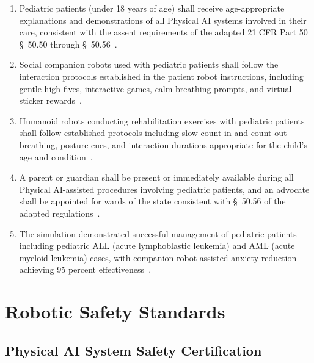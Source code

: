 \documentclass[11pt,letterpaper]{article}
\begin{document}
\begin{enumerate}[label=(\alph*)]
\item Pediatric patients (under 18 years of age) shall receive age-appropriate
  explanations and demonstrations of all Physical AI systems involved in their
  care, consistent with the assent requirements of the adapted 21 CFR Part 50
  \S~50.50 through \S~50.56~\cite{cfr50adapt}.

\item Social companion robots used with pediatric patients shall follow the
  interaction protocols established in the patient robot instructions,
  including gentle high-fives, interactive games, calm-breathing prompts, and
  virtual sticker rewards~\cite{patientinstructions2026}.

\item Humanoid robots conducting rehabilitation exercises with pediatric
  patients shall follow established protocols including slow count-in and
  count-out breathing, posture cues, and interaction durations appropriate for
  the child's age and condition~\cite{patientinstructions2026}.

\item A parent or guardian shall be present or immediately available during all
  Physical AI-assisted procedures involving pediatric patients, and an advocate
  shall be appointed for wards of the state consistent with \S~50.56 of the
  adapted regulations~\cite{cfr50adapt}.

\item The simulation demonstrated successful management of pediatric patients
  including pediatric ALL (acute lymphoblastic leukemia) and AML (acute
  myeloid leukemia) cases, with companion robot-assisted anxiety reduction
  achieving 95 percent effectiveness~\cite{newtrial2026}.
\end{enumerate}

\section{Robotic Safety Standards}

\subsection{Physical AI System Safety Certification}
\end{document}
